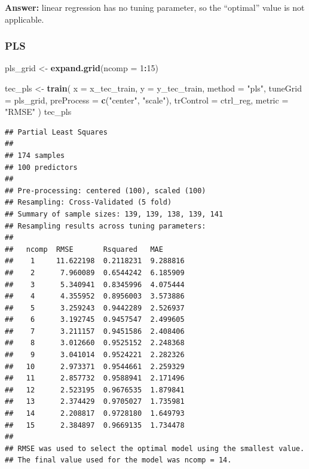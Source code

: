 \documentclass[
  11pt,
]{article}
\newenvironment{Shaded}{\begin{snugshade}}{\end{snugshade}}
\newcommand{\AttributeTok}[1]{\textcolor[rgb]{0.13,0.29,0.53}{#1}}
\newcommand{\DecValTok}[1]{\textcolor[rgb]{0.00,0.00,0.81}{#1}}
\newcommand{\FunctionTok}[1]{\textcolor[rgb]{0.13,0.29,0.53}{\textbf{#1}}}
\newcommand{\NormalTok}[1]{#1}
\newcommand{\OtherTok}[1]{\textcolor[rgb]{0.56,0.35,0.01}{#1}}
\newcommand{\SpecialCharTok}[1]{\textcolor[rgb]{0.81,0.36,0.00}{\textbf{#1}}}
\newcommand{\StringTok}[1]{\textcolor[rgb]{0.31,0.60,0.02}{#1}}
\begin{document}
\textbf{Answer:} linear regression has no tuning parameter, so the
``optimal'' value is not applicable.

\subsubsection{PLS}\label{pls}

\begin{Shaded}
\begin{Highlighting}[]
\NormalTok{pls\_grid }\OtherTok{\textless{}{-}} \FunctionTok{expand.grid}\NormalTok{(}\AttributeTok{ncomp =} \DecValTok{1}\SpecialCharTok{:}\DecValTok{15}\NormalTok{)}

\NormalTok{tec\_pls }\OtherTok{\textless{}{-}} \FunctionTok{train}\NormalTok{(}
  \AttributeTok{x =}\NormalTok{ x\_tec\_train,}
  \AttributeTok{y =}\NormalTok{ y\_tec\_train,}
  \AttributeTok{method =} \StringTok{"pls"}\NormalTok{,}
  \AttributeTok{tuneGrid =}\NormalTok{ pls\_grid,}
  \AttributeTok{preProcess =} \FunctionTok{c}\NormalTok{(}\StringTok{"center"}\NormalTok{, }\StringTok{"scale"}\NormalTok{),}
  \AttributeTok{trControl =}\NormalTok{ ctrl\_reg,}
  \AttributeTok{metric =} \StringTok{"RMSE"}
\NormalTok{)}
\NormalTok{tec\_pls}
\end{Highlighting}
\end{Shaded}

\begin{verbatim}
## Partial Least Squares 
## 
## 174 samples
## 100 predictors
## 
## Pre-processing: centered (100), scaled (100) 
## Resampling: Cross-Validated (5 fold) 
## Summary of sample sizes: 139, 139, 138, 139, 141 
## Resampling results across tuning parameters:
## 
##   ncomp  RMSE       Rsquared   MAE     
##    1     11.622198  0.2118231  9.288816
##    2      7.960089  0.6544242  6.185909
##    3      5.340941  0.8345996  4.075444
##    4      4.355952  0.8956003  3.573886
##    5      3.259243  0.9442289  2.526937
##    6      3.192745  0.9457547  2.499605
##    7      3.211157  0.9451586  2.408406
##    8      3.012660  0.9525152  2.248368
##    9      3.041014  0.9524221  2.282326
##   10      2.973371  0.9544661  2.259329
##   11      2.857732  0.9588941  2.171496
##   12      2.523195  0.9676535  1.879841
##   13      2.374429  0.9705027  1.735981
##   14      2.208817  0.9728180  1.649793
##   15      2.384897  0.9669135  1.734478
## 
## RMSE was used to select the optimal model using the smallest value.
## The final value used for the model was ncomp = 14.
\end{verbatim}
\end{document}
